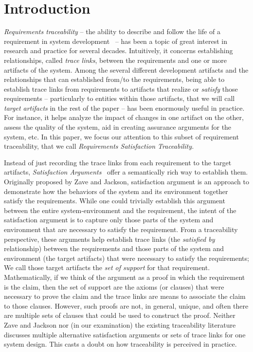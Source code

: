 \section{Introduction}

\emph{Requirements traceability} -- the ability to describe and follow the life of a requirement in system development~\cite{gotel} -- has been a topic of great interest in research and practice for several decades. Intuitively, it concerns establishing relationships, called \emph{trace links}, between the requirements and one or more artifacts of the system. Among the several different development artifacts and the relationships that can established from/to the requirements, being able to establish trace links from requirements to artifacts that realize or \emph{satisfy} those requirements -- particularly to entities within those artifacts, that we will call \emph{target artifacts} in the rest of the paper -- has been enormously useful in practice. For instance, it helps analyze the impact of changes in one artifact on the other, assess the quality of the system, aid in creating assurance arguments for the system, etc. In this paper, we focus our attention to this subset of requirement traceability, that we call \emph{Requirements Satisfaction Traceability.}

Instead of just recording the trace links from each requirement to the target artifacts, \emph{Satisfaction Arguments}~\cite{zave1997four} offer a semantically rich way to establish them. Originally proposed by Zave and Jackson, satisfaction argument is an approach to demonstrate how the behaviors of the system and its environment together satisfy the requirements. While one could trivially establish this argument between the entire system-environment and the requirement, the intent of the satisfaction argument is to capture only those parts of the system and environment that are necessary to satisfy the requirement. From a traceability perspective, these arguments help establish trace links (the \emph{satisfied by} relationship) between the requirements and those parts of the system and environment (the target artifacts) that were necessary to satisfy the requirements; We call those target artifacts the \emph{set of support} for that requirement. Mathematically, if we think of the argument as a proof in which the requirement is the claim, then the set of support are the axioms (or clauses) that were necessary to prove the claim and the trace links are means to associate the claim to those clauses. However, such proofs are not, in general, unique, and often there are multiple sets of clauses that could be used to construct the proof.  Neither Zave and Jackson nor (in our examination) the existing traceability literature discusses multiple alternative satisfaction arguments or sets of trace links for one system design. This casts a doubt on how traceability is perceived in practice.

